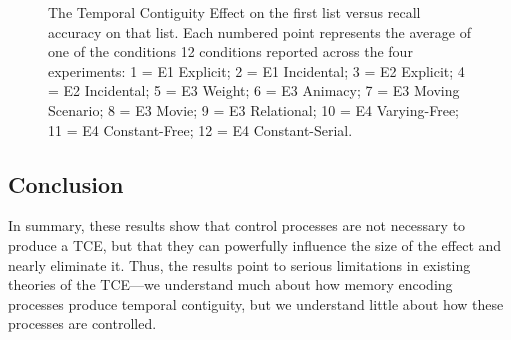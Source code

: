 \documentclass[man,natbib,floatsintext]{apa6} %
\begin{document}
\begin{figure}%
\caption{The Temporal Contiguity Effect on the first list versus recall accuracy on that list. Each numbered point represents the average of one of the conditions 12 conditions reported across the four experiments: 1 = E1 Explicit; 2 = E1 Incidental; 3 = E2 Explicit; 4 = E2 Incidental; 5 = E3 Weight; 6 = E3 Animacy; 7 = E3 Moving Scenario; 8 = E3 Movie; 9 = E3 Relational; 10 = E4 Varying-Free; 11 = E4 Constant-Free; 12 = E4 Constant-Serial.}
\label{corr}
\end{figure}

\color{black}


\subsection{Conclusion}
In summary, these results show that control processes are not necessary to produce a TCE, but that they can powerfully influence the size of the effect and nearly eliminate it. Thus, the results point to serious limitations in existing theories of the TCE---we understand much about how memory encoding processes produce temporal contiguity, but we understand little about how these processes are controlled.


\end{document}
